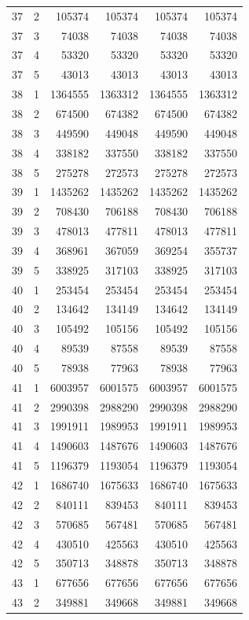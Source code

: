 \begin{longtable}{rrrrrr}
37 & 2 & 105374 & 105374 & 105374 & 105374 \\
37 & 3 & 74038 & 74038 & 74038 & 74038 \\
37 & 4 & 53320 & 53320 & 53320 & 53320 \\
37 & 5 & 43013 & 43013 & 43013 & 43013 \\
38 & 1 & 1364555 & 1363312 & 1364555 & 1363312 \\
38 & 2 & 674500 & 674382 & 674500 & 674382 \\
38 & 3 & 449590 & 449048 & 449590 & 449048 \\
38 & 4 & 338182 & 337550 & 338182 & 337550 \\
38 & 5 & 275278 & 272573 & 275278 & 272573 \\
39 & 1 & 1435262 & 1435262 & 1435262 & 1435262 \\
39 & 2 & 708430 & 706188 & 708430 & 706188 \\
39 & 3 & 478013 & 477811 & 478013 & 477811 \\
39 & 4 & 368961 & 367059 & 369254 & 355737 \\
39 & 5 & 338925 & 317103 & 338925 & 317103 \\
40 & 1 & 253454 & 253454 & 253454 & 253454 \\
40 & 2 & 134642 & 134149 & 134642 & 134149 \\
40 & 3 & 105492 & 105156 & 105492 & 105156 \\
40 & 4 & 89539 & 87558 & 89539 & 87558 \\
40 & 5 & 78938 & 77963 & 78938 & 77963 \\
41 & 1 & 6003957 & 6001575 & 6003957 & 6001575 \\
41 & 2 & 2990398 & 2988290 & 2990398 & 2988290 \\
41 & 3 & 1991911 & 1989953 & 1991911 & 1989953 \\
41 & 4 & 1490603 & 1487676 & 1490603 & 1487676 \\
41 & 5 & 1196379 & 1193054 & 1196379 & 1193054 \\
42 & 1 & 1686740 & 1675633 & 1686740 & 1675633 \\
42 & 2 & 840111 & 839453 & 840111 & 839453 \\
42 & 3 & 570685 & 567481 & 570685 & 567481 \\
42 & 4 & 430510 & 425563 & 430510 & 425563 \\
42 & 5 & 350713 & 348878 & 350713 & 348878 \\
43 & 1 & 677656 & 677656 & 677656 & 677656 \\
43 & 2 & 349881 & 349668 & 349881 & 349668 \\

\end{longtable}
